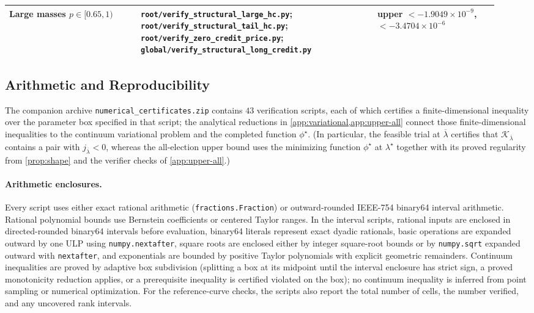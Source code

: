 \documentclass[11pt]{article}
\numberwithin{equation}{section}
\theoremstyle{plain}
\theoremstyle{definition}
\newcommand{\1}{\mathbf{1}}
\newcommand{\calK}{\mathcal{K}}
\begin{document}
\begin{table}[!t]
\begin{tabular}{@{}
  >{\raggedright\arraybackslash}p{0.25\linewidth}
  >{\raggedright\arraybackslash}p{0.45\linewidth}
  >{\raggedright\arraybackslash}p{0.23\linewidth}@{}}
Large masses $p \in [0.65, 1)$ &
  \texttt{root/verify\_structural\_large\_hc.py};\newline
  \texttt{root/verify\_structural\_tail\_hc.py};\newline
  \texttt{root/verify\_zero\_credit\_price.py};\newline
  \texttt{global/verify\_structural\_long\_credit.py} &
  upper $< -1.9049 \times 10^{-9}$, $< -3.4704 \times 10^{-6}$ \\
\bottomrule
\end{tabular}
\end{table}

\subsection{Arithmetic and Reproducibility}
\label{app:verifier-implementation}

The companion archive \texttt{numerical\_certificates.zip} contains $43$ verification scripts, each of which certifies a finite-dimensional inequality over the parameter box specified in that script; the analytical reductions in \cref{app:variational,app:upper-all} connect those finite-dimensional inequalities to the continuum variational problem and the completed function $\phi^\star$. (In particular, the feasible trial at $\overline{\lambda}$ certifies that $\calK_{\overline{\lambda}}$ contains a pair with $j_{\overline{\lambda}} < 0$, whereas the all-election upper bound uses the minimizing function $\phi^\star$ at $\lambda^\star$ together with its proved regularity from \cref{prop:shape} and the verifier checks of \cref{app:upper-all}.)

\paragraph{Arithmetic enclosures.}
Every script uses either exact rational arithmetic (\texttt{fractions.Fraction}) or outward-rounded IEEE-754 binary64 interval arithmetic. Rational polynomial bounds use Bernstein coefficients or centered Taylor ranges. In the interval scripts, rational inputs are enclosed in directed-rounded binary64 intervals before evaluation, binary64 literals represent exact dyadic rationals, basic operations are expanded outward by one ULP using \texttt{numpy.nextafter}, square roots are enclosed either by integer square-root bounds or by \texttt{numpy.sqrt} expanded outward with \texttt{nextafter}, and exponentials are bounded by positive Taylor polynomials with explicit geometric remainders. Continuum inequalities are proved by adaptive box subdivision (splitting a box at its midpoint until the interval enclosure has strict sign, a proved monotonicity reduction applies, or a prerequisite inequality is certified violated on the box); no continuum inequality is inferred from point sampling or numerical optimization. For the reference-curve checks, the scripts also report the total number of cells, the number verified, and any uncovered rank intervals.
\end{document}
